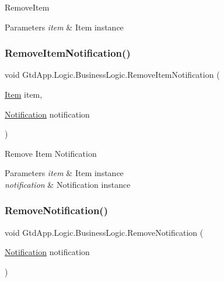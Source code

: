 Remove\+Item 


\begin{DoxyParams}{Parameters}
{\em item} & Item instance\\
\hline
\end{DoxyParams}
\mbox{\label{class_gtd_app_1_1_logic_1_1_business_logic_abacb4aa7a93675d3f564d2eaeb1c1a0d}} 
\subsubsection{\texorpdfstring{Remove\+Item\+Notification()}{RemoveItemNotification()}}
{\footnotesize\ttfamily void Gtd\+App.\+Logic.\+Business\+Logic.\+Remove\+Item\+Notification (\begin{DoxyParamCaption}\item[{\mbox{\hyperlink{class_gtd_app_1_1_data_1_1_item}{Item}}}]{item,  }\item[{\mbox{\hyperlink{class_gtd_app_1_1_data_1_1_notification}{Notification}}}]{notification }\end{DoxyParamCaption})}



Remove Item Notification 


\begin{DoxyParams}{Parameters}
{\em item} & Item instance\\
\hline
{\em notification} & Notification instance\\
\hline
\end{DoxyParams}
\mbox{\label{class_gtd_app_1_1_logic_1_1_business_logic_a5e37ed52aa905917ea518507f0830ecc}} 
\subsubsection{\texorpdfstring{Remove\+Notification()}{RemoveNotification()}}
{\footnotesize\ttfamily void Gtd\+App.\+Logic.\+Business\+Logic.\+Remove\+Notification (\begin{DoxyParamCaption}\item[{\mbox{\hyperlink{class_gtd_app_1_1_data_1_1_notification}{Notification}}}]{notification }\end{DoxyParamCaption})}



